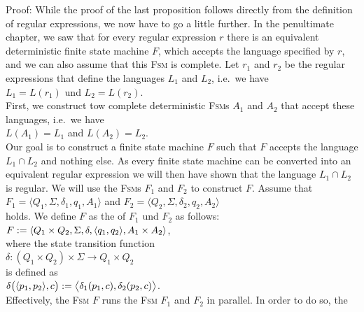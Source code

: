 Proof: While the proof of the last proposition follows directly from the definition of regular expressions,
we now have to go a little further. In the penultimate chapter, we saw that for every regular expression
$r$ there is an equivalent deterministic finite state machine $F$, which accepts the language specified by $r$,
and we can also assume that this \textsc{Fsm} is complete. Let $r_1$ and $r_2$ be the regular expressions that
define the languages $L_1$ and $L_2$, i.e.~we have
\\[0.2cm]
\hspace*{1.3cm}
$L_1 = L(r_1)$ \quad und \quad $L_2 = L(r_2)$.
\\[0.2cm]
First, we construct tow complete deterministic \textsc{Fsm}s
$A_1$ and $A_2$ that accept these languages, i.e.~we have
\\[0.2cm]
\hspace*{1.3cm}
$L(A_1) = L_1$ \quad and \quad $L(A_2) = L_2$.
\\[0.2cm]
Our goal is to construct a finite state machine $F$ such that $F$ accepts the language
$L_1 \cap L_2$ and nothing else.  As every finite state machine can be converted into an equivalent regular
expression we will then have shown that the language
$L_1 \cap L_2$ is regular.  We will use the \textsc{Fsm}s $F_1$ and $F_2$ to construct $F$.
Assume that
\\[0.2cm]
\hspace*{1.3cm}
$F_1 = \langle Q_1, \Sigma, \delta_1, q_1, A_1 \rangle$ \quad and \quad
$F_2 = \langle Q_2, \Sigma, \delta_2, q_2, A_2 \rangle$
\\[0.2cm]
holds.  We define $F$ as the  of $F_1$ und $F_2$ as follows:
\\[0.2cm]
\hspace*{1.3cm}
$F := \langle Q_1 \times Q_2, \Sigma, \delta, \pair(q_1,q_2), A_1 \times A_2 \rangle$,
\\[0.2cm]
where the state transition function 
\\[0.2cm]
\hspace*{1.3cm}
 $\delta : (Q_1 \times Q_2) \times \Sigma \rightarrow Q_1 \times Q_2$ 
\\[0.2cm]
is defined as
\\[0.2cm]
\hspace*{1.3cm}
$\delta\bigl( \pair(p_1, p_2), c \bigr) := \bigl\langle\delta_1(p_1,c), \delta_2(p_2,c)\bigr\rangle$.
\\[0.2cm]
Effectively, the \textsc{Fsm} $F$ runs the \textsc{Fsm} $F_1$ and $F_2$ in parallel.  In order to do so, the
